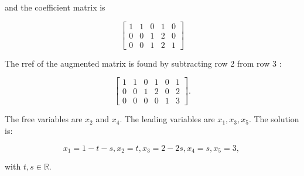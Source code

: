 \documentclass[10pt]{article}
\begin{document}
and the coefficient matrix is

$$
\left[\begin{array}{lllll}
1 & 1 & 0 & 1 & 0 \\
0 & 0 & 1 & 2 & 0 \\
0 & 0 & 1 & 2 & 1
\end{array}\right]
$$

The rref of the augmented matrix is found by subtracting row 2 from row 3 :

$$
\left[\begin{array}{lllll|l}
1 & 1 & 0 & 1 & 0 & 1 \\
0 & 0 & 1 & 2 & 0 & 2 \\
0 & 0 & 0 & 0 & 1 & 3
\end{array}\right] .
$$

The free variables are $x_{2}$ and $x_{4}$. The leading variables are $x_{1}, x_{3}, x_{5}$. The solution is:

$$
x_{1}=1-t-s, x_{2}=t, x_{3}=2-2 s, x_{4}=s, x_{5}=3 \text {, }
$$

with $t, s \in \mathbb{R}$.
\end{document}
